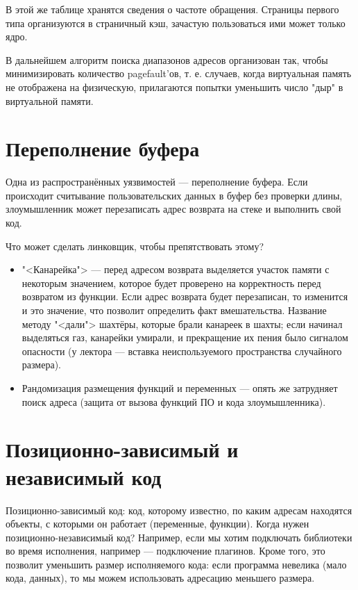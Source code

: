 \documentclass[main]{subfiles}
\begin{document}
В этой же таблице хранятся сведения о частоте обращения. Страницы первого
типа организуются в страничный кэш, зачастую пользоваться ими может только
ядро.

В дальнейшем алгоритм поиска диапазонов адресов организован так, чтобы
минимизировать количество pagefault'ов, т. е. случаев, когда виртуальная
память не отображена на физическую, прилагаются попытки уменьшить число
"дыр" в виртуальной памяти.

\section{Переполнение буфера}
Одна из распространённых уязвимостей --- переполнение буфера.
Если происходит считывание пользовательских данных в буфер без проверки
длины, злоумышленник может перезаписать адрес возврата на стеке и
выполнить свой код.

Что может сделать линковщик, чтобы препятствовать этому?

\begin{itemize}
\item "<Канарейка"> --- перед адресом возврата выделяется участок памяти
с некоторым значением, которое будет проверено на корректность перед
возвратом из функции. Если адрес возврата будет перезаписан, то
изменится и это значение, что позволит определить факт вмешательства.
Название методу "<дали"> шахтёры, которые брали канареек в шахты;
если начинал выделяться газ, канарейки умирали, и прекращение их
пения было сигналом опасности (у лектора --- вставка
неиспользуемого пространства случайного размера).

\item Рандомизация размещения функций и переменных --- опять же затрудняет
поиск адреса (защита от вызова функций ПО и кода злоумышленника).
\end{itemize}

\section{Позиционно-зависимый и независимый код}
Позиционно-зависимый код: код, которому известно, по каким адресам
находятся объекты, с которыми он работает (переменные, функции).
Когда нужен позиционно-независимый код? Например, если мы хотим
подключать библиотеки во время исполнения, например --- подключение плагинов.
Кроме того, это позволит уменьшить размер исполняемого кода:
если программа невелика (мало кода, данных), то мы можем использовать
адресацию меньшего размера.
\end{document}
